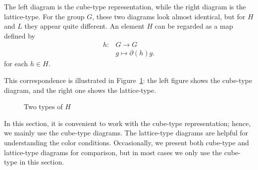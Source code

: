 \documentclass{tac}
\newcommand{\del}{\partial}
\begin{document}
\begin{appendices}
The left diagram is the cube-type representation, while the right diagram is the lattice-type. For the group $G$, these two diagrams look almost identical, but for $H$ and $L$ they appear quite different. An element $H$ can be regarded as a map defined by
\begin{align*}
h: &G \longrightarrow G\\
   &g  \longmapsto \partial(h)g .
\end{align*}
for each $h \in H$.

This correspondence is illustrated in Figure~\ref{d:2-mor}:
the left figure shows the cube-type diagram, and the right one shows the lattice-type.
\begin{figure}
\begin{center}
\end{center}
\caption{Two types of $H$}
\label{d:2-mor}
\end{figure}

In this section, it is convenient to work with the cube-type representation; hence, we mainly use the cube-type diagrams.
The lattice-type diagrams are helpful for understanding the color conditions.
Occasionally, we present both cube-type and lattice-type diagrams for comparison, but in most cases we only use the cube-type in this section.
 

\end{appendices}
\end{document}
